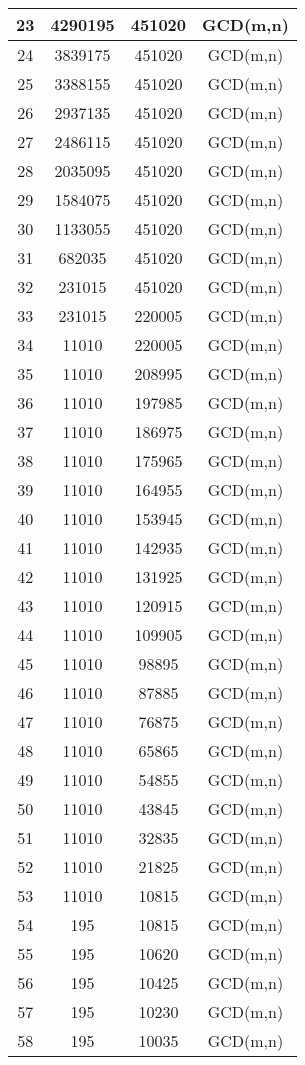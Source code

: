 \begin{longtable}{c|c|c|c}
23&4290195&451020&GCD(m,n)\\\hline
24&3839175&451020&GCD(m,n)\\\hline
25&3388155&451020&GCD(m,n)\\\hline
26&2937135&451020&GCD(m,n)\\\hline
27&2486115&451020&GCD(m,n)\\\hline
28&2035095&451020&GCD(m,n)\\\hline
29&1584075&451020&GCD(m,n)\\\hline
30&1133055&451020&GCD(m,n)\\\hline
31&682035&451020&GCD(m,n)\\\hline
32&231015&451020&GCD(m,n)\\\hline
33&231015&220005&GCD(m,n)\\\hline
34&11010&220005&GCD(m,n)\\\hline
35&11010&208995&GCD(m,n)\\\hline
36&11010&197985&GCD(m,n)\\\hline
37&11010&186975&GCD(m,n)\\\hline
38&11010&175965&GCD(m,n)\\\hline
39&11010&164955&GCD(m,n)\\\hline
40&11010&153945&GCD(m,n)\\\hline
41&11010&142935&GCD(m,n)\\\hline
42&11010&131925&GCD(m,n)\\\hline
43&11010&120915&GCD(m,n)\\\hline
44&11010&109905&GCD(m,n)\\\hline
45&11010&98895&GCD(m,n)\\\hline
46&11010&87885&GCD(m,n)\\\hline
47&11010&76875&GCD(m,n)\\\hline
48&11010&65865&GCD(m,n)\\\hline
49&11010&54855&GCD(m,n)\\\hline
50&11010&43845&GCD(m,n)\\\hline
51&11010&32835&GCD(m,n)\\\hline
52&11010&21825&GCD(m,n)\\\hline
53&11010&10815&GCD(m,n)\\\hline
54&195&10815&GCD(m,n)\\\hline
55&195&10620&GCD(m,n)\\\hline
56&195&10425&GCD(m,n)\\\hline
57&195&10230&GCD(m,n)\\\hline
58&195&10035&GCD(m,n)\\\hline

\end{longtable}
